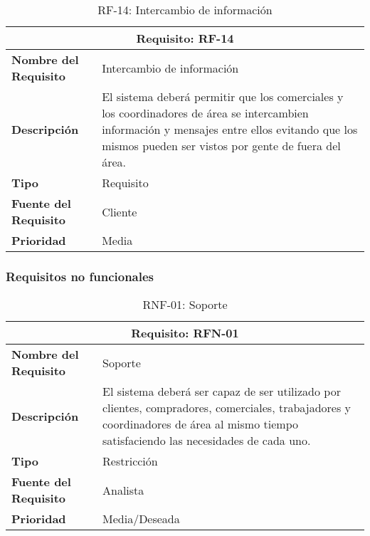 \begin{table}[H]
\begin{center}
\begin{tabular}{p{} p{7cm}}
\multicolumn{2}{c}{\textbf{Requisito: RF-14} } \\
\hline \hline
\textbf{Nombre del Requisito} & Intercambio de información  \\
\hline
\textbf{Descripción} & El sistema deberá permitir que los comerciales y los coordinadores de área se intercambien información y mensajes entre ellos evitando que los mismos pueden ser vistos por gente de fuera del área. \\
\hline
\textbf{Tipo} & Requisito  \\
\hline
\textbf{Fuente del Requisito} & Cliente  \\
\hline
\textbf{Prioridad} & Media  \\ \hline
\end{tabular}
\caption{RF-14: Intercambio de información}
\label{tab:RF-14}
\end{center}
\end{table}




\subsubsection{Requisitos no funcionales}

\begin{table}[H]
\begin{center}
\begin{tabular}{p{} p{7cm}}
\multicolumn{2}{c}{\textbf{Requisito: RFN-01} } \\
\hline \hline
\textbf{Nombre del Requisito} & Soporte  \\
\hline
\textbf{Descripción} & El sistema deberá ser capaz de ser utilizado por clientes, compradores, comerciales, trabajadores y coordinadores de área al mismo tiempo satisfaciendo las necesidades de cada uno. \\
\hline
\textbf{Tipo} & Restricción \\
\hline
\textbf{Fuente del Requisito} &  Analista \\
\hline
\textbf{Prioridad} &  Media/Deseada \\ \hline
\end{tabular}
\caption{RNF-01: Soporte}
\label{tab:RFN-01}
\end{center}
\end{table}

